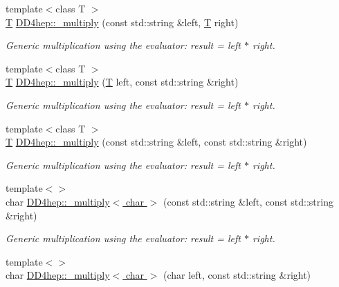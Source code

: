 \begin{DoxyCompactItemize}
{\footnotesize template$<$class T $>$ }\\\hyperlink{class_t}{T} \hyperlink{group___d_d4_h_e_p___g_e_o_m_e_t_r_y_ga3a15f19b6f0559fc4561cb6906f56110}{DD4hep::\_\-multiply} (const std::string \&left, \hyperlink{class_t}{T} right)
\begin{DoxyCompactList}\small\item\em Generic multiplication using the evaluator: result = left $\ast$ right. \item\end{DoxyCompactList}\item 
{\footnotesize template$<$class T $>$ }\\\hyperlink{class_t}{T} \hyperlink{group___d_d4_h_e_p___g_e_o_m_e_t_r_y_gac4300175672d8d262ea612b09ea1360e}{DD4hep::\_\-multiply} (\hyperlink{class_t}{T} left, const std::string \&right)
\begin{DoxyCompactList}\small\item\em Generic multiplication using the evaluator: result = left $\ast$ right. \item\end{DoxyCompactList}\item 
{\footnotesize template$<$class T $>$ }\\\hyperlink{class_t}{T} \hyperlink{group___d_d4_h_e_p___g_e_o_m_e_t_r_y_ga4ae64d76e210fc978cb9e1e77db06963}{DD4hep::\_\-multiply} (const std::string \&left, const std::string \&right)
\begin{DoxyCompactList}\small\item\em Generic multiplication using the evaluator: result = left $\ast$ right. \item\end{DoxyCompactList}\item 
{\footnotesize template$<$$>$ }\\char \hyperlink{group___d_d4_h_e_p___g_e_o_m_e_t_r_y_gaee0200f19487ef1edebcfbd1f36386fc}{DD4hep::\_\-multiply$<$ char $>$} (const std::string \&left, const std::string \&right)
\begin{DoxyCompactList}\small\item\em Generic multiplication using the evaluator: result = left $\ast$ right. \item\end{DoxyCompactList}\item 
{\footnotesize template$<$$>$ }\\char \hyperlink{group___d_d4_h_e_p___g_e_o_m_e_t_r_y_ga7d24403c93188d1f80fcac01bf79d654}{DD4hep::\_\-multiply$<$ char $>$} (char left, const std::string \&right)

\end{DoxyCompactItemize}
